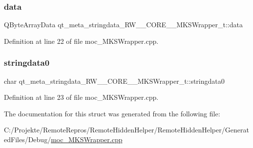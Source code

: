 \subsubsection{\texorpdfstring{data}{data}}
{\footnotesize\ttfamily Q\+Byte\+Array\+Data qt\+\_\+meta\+\_\+stringdata\+\_\+\+R\+W\+\_\+\+\_\+\+C\+O\+R\+E\+\_\+\+\_\+\+M\+K\+S\+Wrapper\+\_\+t\+::data}



Definition at line 22 of file moc\+\_\+\+M\+K\+S\+Wrapper.\+cpp.

\hypertarget{structqt__meta__stringdata___r_w_____c_o_r_e_____m_k_s_wrapper__t_a3e76e021f0d5fc6df11f5a7760ef0411}{}\label{structqt__meta__stringdata___r_w_____c_o_r_e_____m_k_s_wrapper__t_a3e76e021f0d5fc6df11f5a7760ef0411} 
\subsubsection{\texorpdfstring{stringdata0}{stringdata0}}
{\footnotesize\ttfamily char qt\+\_\+meta\+\_\+stringdata\+\_\+\+R\+W\+\_\+\+\_\+\+C\+O\+R\+E\+\_\+\+\_\+\+M\+K\+S\+Wrapper\+\_\+t\+::stringdata0}



Definition at line 23 of file moc\+\_\+\+M\+K\+S\+Wrapper.\+cpp.



The documentation for this struct was generated from the following file\+:\begin{DoxyCompactItemize}
\item 
C\+:/\+Projekte/\+Remote\+Repros/\+Remote\+Hidden\+Helper/\+Remote\+Hidden\+Helper/\+Generated\+Files/\+Debug/\hyperlink{_debug_2moc___m_k_s_wrapper_8cpp}{moc\+\_\+\+M\+K\+S\+Wrapper.\+cpp}\end{DoxyCompactItemize}
